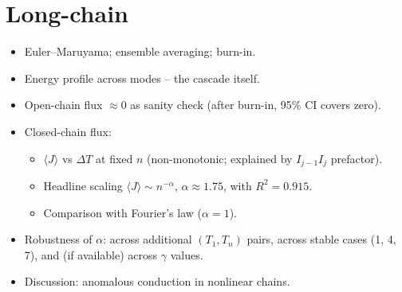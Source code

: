 \documentclass[11pt]{article}
\begin{document}
\section{Long-chain}
\begin{itemize}
  \item Euler--Maruyama; ensemble averaging; burn-in.
  \item Energy profile across modes -- the cascade itself.
  \item Open-chain flux $\approx 0$ as sanity check (after burn-in,
        95\% CI covers zero).
  \item Closed-chain flux:
    \begin{itemize}
      \item $\langle J \rangle$ vs $\Delta T$ at fixed $n$
            (non-monotonic; explained by $I_{j-1} I_j$ prefactor).
      \item Headline scaling $\langle J \rangle \sim n^{-\alpha}$,
            $\alpha \approx 1.75$, with $R^2 = 0.915$.
      \item Comparison with Fourier's law ($\alpha = 1$).
    \end{itemize}
  \item Robustness of $\alpha$: across additional $(T_1, T_n)$ pairs,
        across stable cases (1, 4, 7), and (if available) across
        $\gamma$ values.
  \item Discussion: anomalous conduction in nonlinear chains.
\end{itemize}
\end{document}

